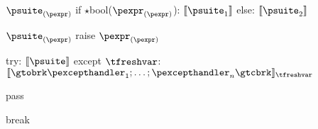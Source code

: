 \documentclass{article}
\begin{document}
\newsavebox{\ifBox}
\begin{lrbox}{\ifBox}
\begin{python}
$\psuite_{(\pexpr)}$
if $\star$bool($\pexpr_{(\pexpr)}$):
  $\meaningof{\psuite_1}$
else:
  $\meaningof{\psuite_2}$
\end{python}
\end{lrbox}

\begin{mathpar}
\end{mathpar}

\newsavebox{\raiseBox}
\begin{lrbox}{\raiseBox}
\begin{python}
$\psuite_{(\pexpr)}$
raise $\pexpr_{(\pexpr)}$
\end{python}
\end{lrbox}

\begin{mathpar}
\end{mathpar}

\newsavebox{\tryBox}
\begin{lrbox}{\tryBox}
\begin{python}
try:
  $\meaningof{\psuite}$
except $\tfreshvar$:
  $\meaningof{\gtobrk \pexcepthandler_1; \ldots; \pexcepthandler_n \gtcbrk}_{\tfreshvar}$
\end{python}
\end{lrbox}

\begin{mathpar}
\end{mathpar}

\newsavebox{\passBox}
\begin{lrbox}{\passBox}
\begin{python}
pass
\end{python}
\end{lrbox}

\begin{mathpar}
\end{mathpar}

\newsavebox{\breakBox}
\begin{lrbox}{\breakBox}
\begin{python}
break
\end{python}
\end{lrbox}
\end{document}
